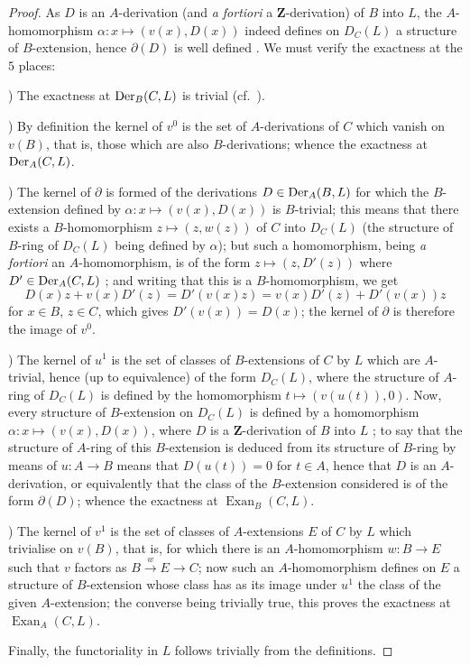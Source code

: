 \begin{proof}
As $D$ is an $A$-derivation (and \emph{a fortiori} a $\mathbf{Z}$-derivation) of $B$ into $L$, the $A$-homomorphism $\alpha:x\mapsto(v(x),D(x))$ indeed defines on $D_C(L)$ a structure of $B$-extension, hence $\partial(D)$ is well defined .
We must verify the exactness at the $5$ places:

\medskip
{})\enspace
The exactness at $\operatorname{Der}_B(C,L)$ is trivial (cf.\ ).

\medskip
{})\enspace
By definition  the kernel of $v^0$ is the set of $A$-derivations of $C$ which vanish on $v(B)$, that is, those which are also $B$-derivations; whence the exactness at $\operatorname{Der}_A(C,L)$.

\medskip
{})\enspace
The kernel of $\partial$ is formed of the derivations $D\in\operatorname{Der}_A(B,L)$ for which the $B$-extension defined by $\alpha:x\mapsto(v(x),D(x))$ is $B$-trivial; this means  that there exists a $B$-homomorphism $z\mapsto(z,w(z))$ of $C$ into $D_C(L)$ (the structure of $B$-ring of $D_C(L)$ being defined by $\alpha$); but such a homomorphism, being \emph{a fortiori} an $A$-homomorphism, is of the form $z\mapsto(z,D'(z))$ where $D'\in\operatorname{Der}_A(C,L)$ ; and writing that this is a $B$-homomorphism, we get
\[
  D(x)z+v(x)D'(z) = D'(v(x)z) = v(x)D'(z)+D'(v(x))z
\]
for $x\in B$, $z\in C$, which gives $D'(v(x))=D(x)$; the kernel of $\partial$ is therefore the image of $v^0$.

\medskip
{})\enspace
The kernel of $u^1$ is the set of classes of $B$-extensions of $C$ by $L$ which are $A$-trivial, hence (up to equivalence) of the form $D_C(L)$, where the structure of $A$-ring of $D_C(L)$ is defined by the homomorphism $t\mapsto(v(u(t)),0)$.
Now, every structure of $B$-extension on $D_C(L)$ is defined by a homomorphism $\alpha:x\mapsto(v(x),D(x))$, where $D$ is a $\mathbf{Z}$-derivation of $B$ into $L$ ; to say that the structure of $A$-ring of this $B$-extension is deduced from its structure of $B$-ring by means of $u:A\to B$ means that $D(u(t))=0$ for $t\in A$, hence that $D$ is an $A$-derivation, or equivalently that the class of the $B$-extension considered is of the form $\partial(D)$; whence the exactness at $\operatorname{Exan}_B(C,L)$.

\medskip
{})\enspace
The kernel of $v^1$ is the set of classes of $A$-extensions $E$ of $C$ by $L$ which trivialise on $v(B)$, that is, for which there is an $A$-homomorphism $w:B\to E$ such that $v$ factors as $B\xrightarrow{w}E\to C$; now such an $A$-homomorphism defines on $E$ a structure of $B$-extension whose class has as its image under $u^1$ the class of the given $A$-extension; the converse being trivially true, this proves the exactness at $\operatorname{Exan}_A(C,L)$.

Finally, the functoriality in $L$ follows trivially from the definitions.
\end{proof}

